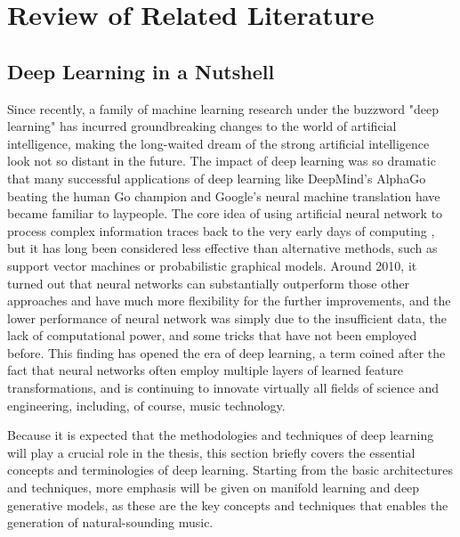 
\graphicspath{{2-review/figures/}}

\chapter{Review of Related Literature}
\label{ch:review}


\section{Deep Learning in a Nutshell}\label{sec:deeplearning}

Since recently, a family of machine learning research under the buzzword "deep learning" has incurred groundbreaking changes to the world of artificial intelligence, making the long-waited dream of the strong artificial intelligence look not so distant in the future.
The impact of deep learning was so dramatic that many successful applications of deep learning like DeepMind's AlphaGo beating the human Go champion and Google's neural machine translation have became familiar to laypeople.
The core idea of using artificial neural network to process complex information traces back to the very early days of computing \cite{kleene1951representation}, but it has long been considered less effective than alternative methods, such as support vector machines or probabilistic graphical models.
Around 2010, it turned out that neural networks can substantially outperform those other approaches and have much more flexibility for the further improvements, and the lower performance of neural network was simply due to the insufficient data, the lack of computational power, and some tricks that have not been employed before.
This finding has opened the era of deep learning, a term coined after the fact that neural networks often employ multiple layers of learned feature transformations, and is continuing to innovate virtually all fields of science and engineering, including, of course, music technology.

Because it is expected that the methodologies and techniques of deep learning will play a crucial role in the thesis, this section briefly covers the essential concepts and terminologies of deep learning. Starting from the basic architectures and techniques, more emphasis will be given on manifold learning and deep generative models, as these are the key concepts and techniques that enables the generation of natural-sounding music.


